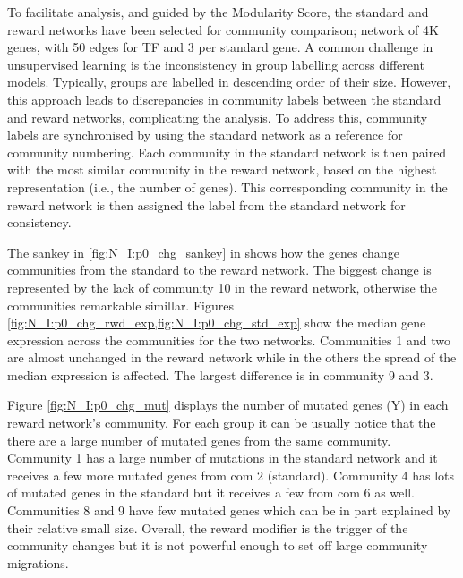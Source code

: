 To facilitate analysis, and guided by the Modularity Score, the standard and reward networks have been selected for community comparison; network of 4K genes, with 50 edges for TF and 3 per standard gene. A common challenge in unsupervised learning is the inconsistency in group labelling across different models. Typically, groups are labelled in descending order of their size. However, this approach leads to discrepancies in community labels between the standard and reward networks, complicating the analysis. To address this, community labels are synchronised by using the standard network as a reference for community numbering. Each community in the standard network is then paired with the most similar community in the reward network, based on the highest representation (i.e., the number of genes). This corresponding community in the reward network is then assigned the label from the standard network for consistency.

The sankey in \cref{fig:N_I:p0_chg_sankey} in shows how the genes change communities from the standard to the reward network. The biggest change is represented by the lack of community 10 in the reward network, otherwise the communities remarkable simillar. Figures \cref{fig:N_I:p0_chg_rwd_exp,fig:N_I:p0_chg_std_exp} show the median gene expression across the communities for the two networks. Communities 1 and two are almost unchanged in the reward network while in the others the spread of the median expression is affected. The largest difference is in community 9 and 3.  

Figure \ref{fig:N_I:p0_chg_mut} displays the number of mutated genes (Y) in each reward network's community. For each group it can be usually notice that the there are a large number of mutated genes from the same community. Community 1 has a large number of mutations in the standard network and it receives a few more mutated genes from com 2 (standard). Community 4 has lots of mutated genes in the standard but it receives a few from com 6 as well. Communities 8 and 9 have few mutated genes which can be in part explained by their relative small size. Overall, the reward modifier is the trigger of the community changes but it is not powerful enough to set off large community migrations.


